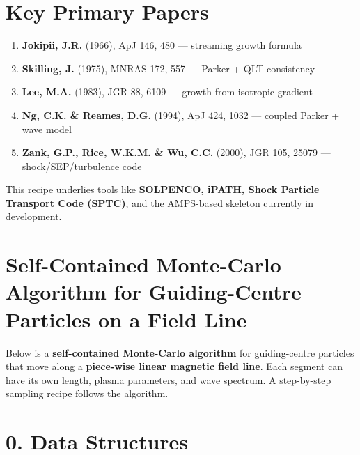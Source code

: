 \section*{Key Primary Papers}

\begin{enumerate}
    \item \textbf{Jokipii, J.R.} (1966), ApJ 146, 480 — streaming growth formula
    \item \textbf{Skilling, J.} (1975), MNRAS 172, 557 — Parker + QLT consistency
    \item \textbf{Lee, M.A.} (1983), JGR 88, 6109 — growth from isotropic gradient
    \item \textbf{Ng, C.K. \& Reames, D.G.} (1994), ApJ 424, 1032 — coupled Parker + wave model
    \item \textbf{Zank, G.P., Rice, W.K.M. \& Wu, C.C.} (2000), JGR 105, 25079 — shock/SEP/turbulence code
\end{enumerate}

\vspace{1em}
This recipe underlies tools like \textbf{SOLPENCO, iPATH, Shock Particle Transport Code (SPTC)}, and the AMPS-based skeleton currently in development.

\section*{Self-Contained Monte-Carlo Algorithm for Guiding-Centre Particles on a Field Line}

Below is a \textbf{self-contained Monte-Carlo algorithm} for guiding-centre particles that move along a \textbf{piece-wise linear magnetic field line}. Each segment can have its own length, plasma parameters, and wave spectrum. A step-by-step sampling recipe follows the algorithm.

\section*{0. Data Structures}

